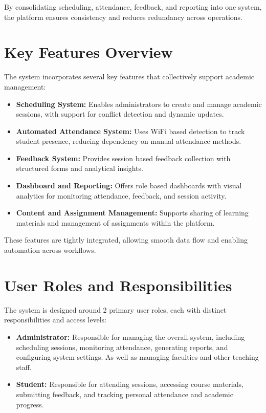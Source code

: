 By consolidating scheduling, attendance, feedback, and reporting into one system, the platform
ensures consistency and reduces redundancy across operations.

\section{Key Features Overview}

The system incorporates several key features that collectively support academic management:

\begin{itemize}
    \item \textbf{Scheduling System:}
    Enables administrators to create and manage academic sessions, with support for conflict
    detection and dynamic updates.

    \item \textbf{Automated Attendance System:}
    Uses WiFi based detection to track student presence, reducing dependency on manual
    attendance methods.

    \item \textbf{Feedback System:}
    Provides session based feedback collection with structured forms and analytical insights.

    \item \textbf{Dashboard and Reporting:}
    Offers role based dashboards with visual analytics for monitoring attendance, feedback, and
    session activity.

    \item \textbf{Content and Assignment Management:}
    Supports sharing of learning materials and management of assignments within the platform.
\end{itemize}

These features are tightly integrated, allowing smooth data flow and enabling automation across
workflows.

\section{User Roles and Responsibilities}

The system is designed around 2 primary user roles, each with distinct responsibilities and access
levels:

\begin{itemize}
    \item \textbf{Administrator:}
    Responsible for managing the overall system, including scheduling sessions, monitoring
    attendance, generating reports, and configuring system settings. As well as managing
    faculties and other teaching staff.

    \item \textbf{Student:}
    Responsible for attending sessions, accessing course materials, submitting feedback, and
    tracking personal attendance and academic progress.
\end{itemize}

